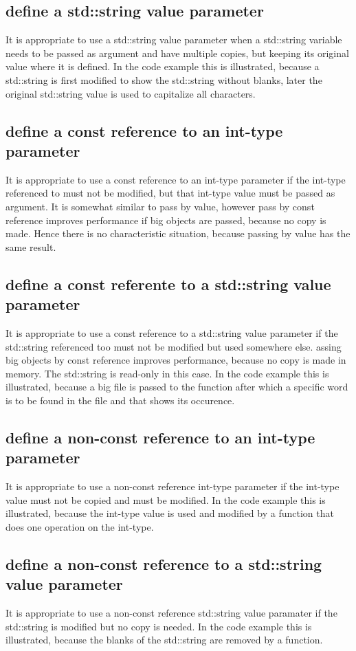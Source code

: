 \documentclass[a4paper]{article}
\begin{document}
\subsection*{define a std::string value parameter}
It is appropriate to use a std::string value parameter when a std::string variable needs to be passed as argument and have multiple copies, but keeping its original value where it is defined. In the code example this is illustrated, because a std::string is first modified to show the std::string without blanks, later the original std::string value is used to capitalize all characters.

\subsection*{define a const reference to an int-type parameter}
It is appropriate to use a const reference to an int-type parameter if the int-type referenced to must not be modified, but that int-type value must be passed as argument. It is somewhat similar to pass by value, however pass by const reference improves performance if big objects are passed, because no copy is made. Hence there is no characteristic situation, because passing by value has the same result.
\subsection*{define a const referente to a std::string value parameter}
It is appropriate to use a const reference to a std::string value parameter if the std::string referenced too must not be modified but used somewhere else. assing big objects by const reference improves performance, because no copy is made in memory. The std::string is read-only in this case. In the code example this is illustrated, because a big file is passed to the function after which a specific word is to be found in the file and that shows its occurence.

\subsection*{define a non-const reference to an int-type parameter}
It is appropriate to use a non-const reference int-type parameter if the int-type value must not be copied and must be modified. In the code example this is illustrated, because the int-type value is used and modified by a function that does one operation on the int-type.

\subsection*{define a non-const reference to a std::string value parameter}
It is appropriate to use a non-const reference std::string value paramater if the std::string is modified but no copy is needed. In the code example this is illustrated, because the blanks of the std::string are removed by a function.

\end{document}
